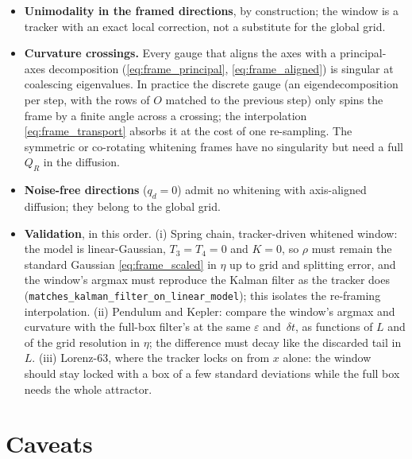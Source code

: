 \documentclass[11pt,a4paper]{article}
\newcommand{\eps}{\varepsilon}
\newcommand{\dt}{\,\delta t}
\theoremstyle{plain}
\theoremstyle{definition}
\theoremstyle{remark}
\begin{document}
\begin{itemize}[leftmargin=1.5em]
  \item \textbf{Unimodality in the framed directions}, by construction; the window is a tracker with an exact local correction, not a substitute for the global grid.
  \item \textbf{Curvature crossings.} Every gauge that aligns the axes with a principal-axes decomposition (\eqref{eq:frame_principal}, \eqref{eq:frame_aligned}) is singular at coalescing eigenvalues. In practice the discrete gauge (an eigendecomposition per step, with the rows of $O$ matched to the previous step) only spins the frame by a finite angle across a crossing; the interpolation \eqref{eq:frame_transport} absorbs it at the cost of one re-sampling. The symmetric or co-rotating whitening frames have no singularity but need a full $Q_R$ in the diffusion.
  \item \textbf{Noise-free directions} ($q_d=0$) admit no whitening with axis-aligned diffusion; they belong to the global grid.
  \item \textbf{Validation}, in this order. (i) Spring chain, tracker-driven whitened window: the model is linear-Gaussian, $T_3=T_4=0$ and $K=0$, so $\rho$ must remain the standard Gaussian \eqref{eq:frame_scaled} in $\eta$ up to grid and splitting error, and the window's argmax must reproduce the Kalman filter as the tracker does (\texttt{matches\_kalman\_filter\_on\_linear\_model}); this isolates the re-framing interpolation. (ii) Pendulum and Kepler: compare the window's argmax and curvature with the full-box filter's at the same $\eps$ and $\dt$, as functions of $L$ and of the grid resolution in $\eta$; the difference must decay like the discarded tail in $L$. (iii) Lorenz-63, where the tracker locks on from $x$ alone: the window should stay locked with a box of a few standard deviations while the full box needs the whole attractor.
\end{itemize}

\section{Caveats}
\end{document}
